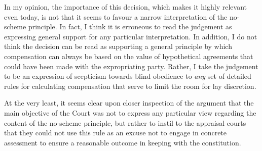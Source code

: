 In my opinion, the importance of this decision, which makes it highly relevant even today, is not that it seems to favour a narrow interpretation of the no-scheme principle. In fact, I think it is erroneous to read the judgement as expressing general support for any particular interpretation. In addition, I do not think the decision can be read as supporting a general principle by which compensation can always be based on the value of hypothetical agreements that could have been made with the expropriating party. Rather, I take the judgement to be an expression of scepticism towards blind obedience to \emph{any} set of detailed rules for calculating compensation that serve to limit the room for lay discretion.

At the very least, it seems clear upon closer inspection of the argument that the main objective of the Court was not to express any particular view regarding the content of the no-scheme principle, but rather to instil to the appraisal courts that they could not use this rule as an excuse not to engage in concrete assessment to ensure a reasonable outcome in keeping with the constitution.

